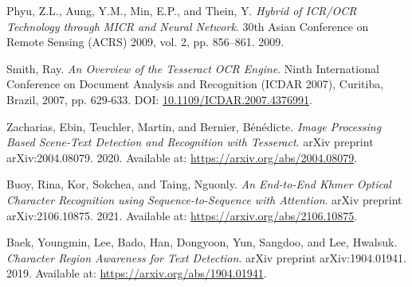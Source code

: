 \begin{thebibliography}{99}
Phyu, Z.L., Aung, Y.M., Min, E.P., and Thein, Y.
\textit{Hybrid of ICR/OCR Technology through MICR and Neural Network}.
30th Asian Conference on Remote Sensing (ACRS) 2009, vol. 2, pp. 856–861.
2009.


Smith, Ray.
\textit{An Overview of the Tesseract OCR Engine}.
Ninth International Conference on Document Analysis and Recognition (ICDAR 2007), Curitiba, Brazil, 2007, pp. 629-633.
DOI: \href{https://doi.org/10.1109/ICDAR.2007.4376991}{10.1109/ICDAR.2007.4376991}.

Zacharias, Ebin, Teuchler, Martin, and Bernier, Bénédicte.
\textit{Image Processing Based Scene-Text Detection and Recognition with Tesseract}.
arXiv preprint arXiv:2004.08079.
2020.
Available at: \href{https://arxiv.org/abs/2004.08079}{https://arxiv.org/abs/2004.08079}.

Buoy, Rina, Kor, Sokchea, and Taing, Nguonly.
\textit{An End-to-End Khmer Optical Character Recognition using Sequence-to-Sequence with Attention}.
arXiv preprint arXiv:2106.10875.
2021.
Available at: \href{https://arxiv.org/abs/2106.10875}{https://arxiv.org/abs/2106.10875}.

Baek, Youngmin, Lee, Bado, Han, Dongyoon, Yun, Sangdoo, and Lee, Hwalsuk.
\textit{Character Region Awareness for Text Detection}.
arXiv preprint arXiv:1904.01941.
2019.
Available at: \href{https://arxiv.org/abs/1904.01941}{https://arxiv.org/abs/1904.01941}.


\end{thebibliography}
